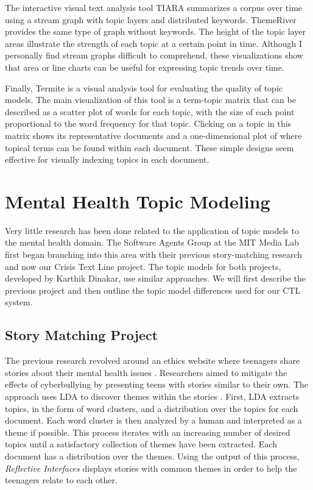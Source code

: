 The interactive visual text analysis tool TIARA \cite{tiara} summarizes a corpus over time using a stream graph with topic layers and distributed keywords. ThemeRiver \cite{theme-river} provides the same type of graph without keywords. The height of the topic layer areas illustrate the strength of each topic at a certain point in time. Although I personally find stream graphs difficult to comprehend, these visualizations show that area or line charts can be useful for expressing topic trends over time.

Finally, Termite \cite{termite} is a visual analysis tool for evaluating the quality of topic models. The main visualization of this tool is a term-topic matrix that can be described as a scatter plot of words for each topic, with the size of each point proportional to the word frequency for that topic. Clicking on a topic in this matrix shows its representative documents and a one-dimensional plot of where topical terms can be found within each document. These simple designs seem effective for visually indexing topics in each document.

\section{Mental Health Topic Modeling}

Very little research has been done related to the application of topic models to the mental health domain. The Software Agents Group at the MIT Media Lab first began branching into this area with their previous story-matching research and now our Crisis Text Line project. The topic models for both projects, developed by Karthik Dinakar, use similar approaches. We will first describe the previous project and then outline the topic model differences used for our CTL system.

\subsection{Story Matching Project}

The previous research revolved around an ethics website where teenagers share stories about their mental health issues \cite{mtv-atl}. Researchers aimed to mitigate the effects of cyberbullying by presenting teens with stories similar to their own. The approach uses LDA to discover themes within the stories \cite{dinakar-mtv}. First, LDA extracts topics, in the form of word clusters, and a distribution over the topics for each document. Each word cluster is then analyzed by a human and interpreted as a theme if possible. This process iterates with an increasing number of desired topics until a satisfactory collection of themes have been extracted. Each document has a distribution over the themes. Using the output of this process, \textit{Reflective Interfaces} \cite{reflective-interfaces} displays stories with common themes in order to help the teenagers relate to each other.

